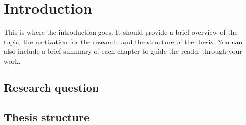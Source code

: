 \chapter{Introduction} \label{sec:introduction}

This is where the introduction goes. It should provide a brief overview of the topic, the motivation for the research,
and the structure of the thesis. You can also include a brief summary of each chapter to guide the reader through your
work. \cite{biblatex}

\section{Research question}

\section{Thesis structure}
